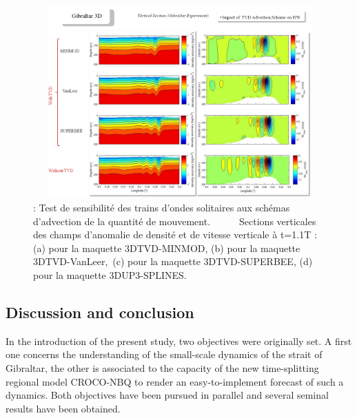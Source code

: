 
\begin{figure}[!h]
	\begin{Center}
		\includegraphics[width=6.3in,height=2.91in]{./media/TVD5.png}
		\caption{: Test de sensibilité des trains d’ondes solitaires aux schémas d’advection de la quantité de mouvement.\ \ \ \ \ \   Sections verticales des champs d’anomalie de densité et de vitesse verticale à t=1.1T : (a)  pour la maquette 3DTVD-MINMOD, (b) pour la maquette 3DTVD-VanLeer,\  (c)  pour la maquette 3DTVD-SUPERBEE, (d) pour la maquette 3DUP3-SPLINES.}
		\label{Fig_TVD5}
	\end{Center}
\end{figure}




\subsection{Discussion and conclusion}


In the introduction of the present study, two objectives were originally set. A first one concerns the understanding of the small-scale dynamics of the strait of Gibraltar, the other is associated to the capacity of the new time-splitting regional model CROCO-NBQ to render an easy-to-implement forecast of such a dynamics. Both objectives have been pursued in parallel and several seminal results have been obtained.

